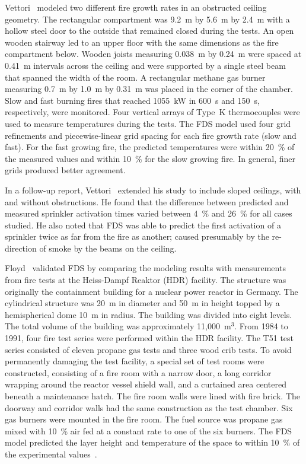 Vettori~\cite{Vettori:1} modeled two different fire growth rates in an obstructed ceiling geometry.  The rectangular compartment was 9.2~m by 5.6~m
by 2.4~m  with a hollow steel door to  the outside that remained closed during the tests. An open wooden stairway led to an upper floor with the same
dimensions as the fire compartment below.  Wooden joists measuring 0.038~m by 0.24~m were spaced at 0.41~m intervals across the ceiling and  were
supported  by a single  steel beam that  spanned the width of the  room.  A rectangular methane gas  burner measuring 0.7~m by 1.0~m by 0.31~m was
placed  in the corner of the chamber.  Slow and fast  burning  fires  that  reached  1055~kW  in  600~s  and  150~s, respectively,  were
monitored.   Four   vertical  arrays  of  Type~K thermocouples were used to measure temperatures during the tests.  The FDS model used four grid
refinements and piecewise-linear grid spacing for each fire growth rate (slow  and fast). For the fast growing fire, the predicted  temperatures were
within  20~\% of the  measured values and within  10~\% for the slow  growing fire. In  general, finer grids produced better agreement.

In a follow-up report,  Vettori~\cite{Vettori:2} extended his study to include sloped ceilings, with  and without obstructions. He found that the
difference between  predicted and  measured  sprinkler activation times varied  between 4~\%  and 26~\% for  all cases studied.  He also noted that
FDS was able to predict the first activation of a sprinkler twice  as far  from  the fire  as  another; caused  presumably by  the re-direction of
smoke by the beams on the ceiling.

Floyd~\cite{Floyd:5,Floyd:6} validated  FDS by comparing  the modeling results with  measurements from fire tests at  the Heiss-Dampf Reaktor (HDR)
facility.  The structure was originally the containment building for a nuclear power reactor  in Germany. The cylindrical structure was 20~m in
diameter and  50~m in height  topped by a  hemispherical dome 10~m  in radius.   The building  was divided  into eight  levels.  The total  volume of
the building  was approximately  11,000~m$^3$.  From 1984  to 1991, four  fire test  series were  performed within  the HDR facility.  The T51  test
series consisted of eleven  propane gas tests and three  wood crib  tests.  To avoid  permanently damaging  the test facility, a special set of  test
rooms were constructed, consisting of a fire  room with a narrow  door, a long corridor  wrapping around the reactor vessel  shield wall, and  a
curtained area centered  beneath a maintenance  hatch.   The  fire   room  walls  were  lined  with  fire brick. The doorway and corridor walls had
the same construction as the test chamber. Six gas burners were mounted in the fire room.  The fuel source was propane gas mixed with  10~\% air fed
at a constant rate to one of the  six burners.
The FDS model predicted the  layer height and temperature of the space to within 10~\% of the experimental values~\cite{Floyd:5}.

